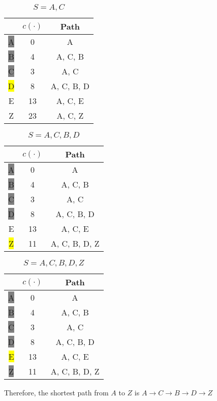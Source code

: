 \begin{eg}
\begin{minipage}{.3\textwidth}
  \begin{table}[H]
    \centering
    \begin{tabular}{c|c|c}
      \toprule
       & \(c(\cdot)\) & Path \\
    \midrule
    \colorbox{Gray}{A} & 0 & A  \\
    \colorbox{Gray}{B} & 4 & A, C, B  \\
    \colorbox{Gray}{C} & 3 & A, C  \\
    \colorbox{Yellow}{D} & 8 & A, C, B, D  \\
      E & 13 & A, C, E  \\
      Z & 23 & A, C, Z  \\
  \end{tabular}
    \caption*{\(S = A, C\)}
  \end{table}
\end{minipage}
\begin{minipage}{.3\textwidth}
  \begin{table}[H]
    \centering
    \begin{tabular}{c|c|c}
      \toprule
       & \(c(\cdot)\) & Path \\
    \midrule
    \colorbox{Gray}{A} & 0 & A  \\
    \colorbox{Gray}{B} & 4 & A, C, B  \\
    \colorbox{Gray}{C} & 3 & A, C  \\
    \colorbox{Gray}{D} & 8 & A, C, B, D  \\
      E & 13 & A, C, E  \\
    \colorbox{Yellow}{Z} & 11 & A, C, B, D, Z  \\
  \end{tabular}
    \caption*{\(S = A, C, B, D\)}
  \end{table}
\end{minipage}
\begin{minipage}{.3\textwidth}
  \begin{table}[H]
    \centering
    \begin{tabular}{c|c|c}
      \toprule
       & \(c(\cdot)\) & Path \\
    \midrule
    \colorbox{Gray}{A} & 0 & A  \\
    \colorbox{Gray}{B} & 4 & A, C, B  \\
    \colorbox{Gray}{C} & 3 & A, C  \\
    \colorbox{Gray}{D} & 8 & A, C, B, D  \\
    \colorbox{Yellow}{E} & 13 & A, C, E  \\
    \colorbox{Gray}{Z} & 11 & A, C, B, D, Z  \\
  \end{tabular}
    \caption*{\(S = A, C, B, D, Z\)}
  \end{table}
\end{minipage}

Therefore, the shortest path from \(A\) to \(Z\) is \(A \to C \to B \to D \to Z\) 
\end{eg}

